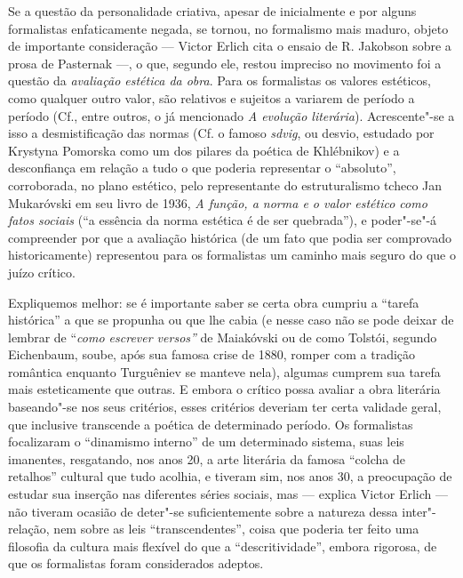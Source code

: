 Se a questão da personalidade criativa, apesar de inicialmente e por
alguns formalistas enfaticamente negada, se tornou, no formalismo mais
maduro, objeto de importante consideração --- Victor Erlich cita o ensaio
de R. Jakobson sobre a prosa de Pasternak ---, o
que, segundo ele, restou impreciso no movimento foi a questão da
\emph{avaliação estética da obra}. Para os formalistas os valores
estéticos, como qualquer outro valor, são relativos e sujeitos a
variarem de período a período (Cf., entre outros, o já mencionado
\emph{A evolução literária}). Acrescente"-se a isso a desmistificação das
normas (Cf. o famoso \emph{sdvig}, ou desvio, estudado por Krystyna
Pomorska como um dos pilares da poética de Khlébnikov) e a desconfiança
em relação a tudo o que poderia representar o ``absoluto'', corroborada,
no plano estético, pelo representante do estruturalismo tcheco Jan
Mukaróvski em seu livro de 1936, \emph{A função, a norma e o valor
estético como fatos sociais} (``a essência da norma estética é de ser
quebrada''), e poder"-se"-á compreender por que a avaliação histórica (de
um fato que podia ser comprovado historicamente) representou para os
formalistas um caminho mais seguro do que o juízo crítico.

Expliquemos melhor: se é importante saber se certa obra cumpriu a
``tarefa histórica'' a que se propunha ou que lhe cabia (e nesse caso
não se pode deixar de lembrar de ``\emph{como escrever versos''} de
Maiakóvski ou de como Tolstói, segundo Eichenbaum, soube, após sua
famosa crise de 1880, romper com a tradição romântica enquanto
Turguêniev se manteve nela), algumas cumprem sua tarefa mais
esteticamente que outras. E embora o crítico possa avaliar a obra
literária baseando"-se nos seus critérios, esses critérios deveriam ter
certa validade geral, que inclusive transcende a poética de determinado
período. Os formalistas focalizaram o ``dinamismo interno'' de um
determinado sistema, suas leis imanentes, resgatando, nos anos 20, a
arte literária da famosa ``colcha de retalhos'' cultural que tudo
acolhia, e tiveram sim, nos anos 30, a preocupação de estudar sua
inserção nas diferentes séries sociais, mas --- explica Victor Erlich ---
não tiveram ocasião de deter"-se suficientemente sobre a natureza dessa
inter"-relação, nem sobre as leis ``transcendentes'', coisa que poderia
ter feito uma filosofia da cultura mais flexível do que a
``descritividade'', embora rigorosa, de que os formalistas foram considerados
adeptos.


